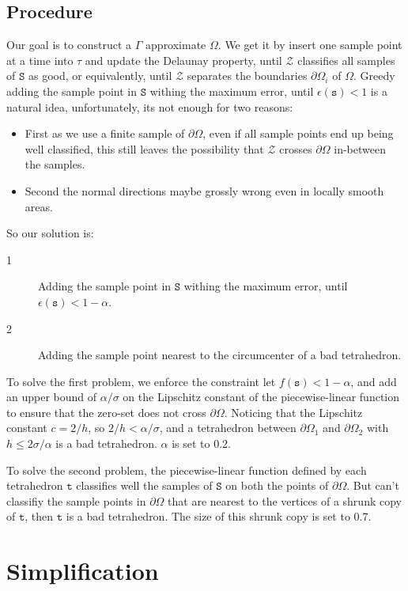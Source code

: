 \documentclass{article}
\theoremstyle{definition}
\theoremstyle{remark}
\begin{document}
\subsection{Procedure}
Our goal is to construct a $\Gamma$ approximate $\Omega$. We get it by insert one sample point at a time into $\tau$ and update the Delaunay property, until $\mathcal{Z}$ classifies all samples of  $\mathtt{S}$ as good, or equivalently, until $\mathcal{Z}$ separates the boundaries $\partial \Omega_i$ of $\Omega$.
Greedy adding the sample point in  $\mathtt{S}$ withing the maximum error, until $\epsilon(\mathtt{s})<1$ is a natural idea, unfortunately, its not enough for two reasons:
\begin{itemize}
\item First as we use a finite sample of $\partial \Omega$, even if all sample points end up being well classified, this still leaves the possibility that $\mathcal{Z}$ crosses $\partial \Omega$ in-between the samples.
 \item Second the normal directions maybe grossly wrong even in locally smooth areas.
 \end{itemize}
So our solution is:
\begin{description}
 \item[1] Adding the sample point in  $\mathtt{S}$ withing the maximum error, until $\epsilon(\mathtt{s}) < 1- \alpha$.
 \item[2] Adding the sample point nearest to the circumcenter of a bad tetrahedron.
\end{description}
\par To solve the first problem, we enforce the constraint let $f(\mathtt{s}) < 1 - \alpha$, and add an upper bound of $\alpha / \sigma$ on the Lipschitz constant of the piecewise-linear function to ensure that the zero-set does not cross $\partial \Omega$.  Noticing that  the Lipschitz constant $c=2/h$, so $2/h < \alpha / \sigma$, and a tetrahedron between $\partial \Omega_1$ and $\partial \Omega_2$ with $h \le 2\sigma / \alpha$ is a bad tetrahedron. $\alpha$ is set to 0.2.
\par To solve the second problem, the piecewise-linear function defined by each tetrahedron $\mathtt{t}$ classifies well the samples of  $\mathtt{S}$ on both the points of $\partial \Omega$. But can't classifiy the sample points in $\partial \Omega$ that are nearest to the vertices of a shrunk copy of $\mathtt{t}$, then $\mathtt{t}$ is a bad tetrahedron. The size of this shrunk copy is set to 0.7.
\section{Simplification}
\end{document}
